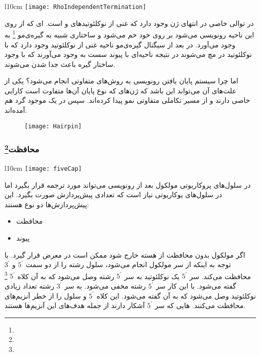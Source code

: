 \vspace{2.7cm}
\begin{wrapfigure}[13]{l}{10cm}
\centering
\texttt{[image: RhoIndependentTermination]}
\end{wrapfigure}

در
توالی خاصی در انتهای ژن وجود دارد که  غنی از نوکلئوتید‌های
و
است.
ای که از روی این ناحیه رونویسی می‌شود بر روی خود خم می‌شود و ساختاری شبیه به گیره‌ی‌مو
\footnote{}
به وجود می‌آورد.
در
بعد از سیگنال گیره‌ی‌مو ناحیه غنی از نوکلئوتید
وجود دارد که با نوکلئوتید
در
مچ می‌شوند در نتیجه ناحیه‌ای با پیوند سست به وجود می‌آورند که با وجود ساختار گیره‌ باعث جدا شدن
می‌شوند.

اما چرا سیستم پایان یافتن رونویسی به روش‌های متفاوتی انجام می‌شود؟ یکی از علت‌های آن می‌تواند این باشد که ژن‌های که نوع پایان آن‌ها متفاوت است کارایی خاصی دارند و از مسیر تکاملی متفاوتی نمو پیدا کرده‌اند. سپس در یک موجود گرد هم آمده‌اند.

\begin{figure}[htbp]
\centering
\texttt{[image: Hairpin]}
\end{figure}

\pagebreak
\subsubsection{محافظت\protect\footnote{}}

\begin{wrapfigure}[20]{l}{10cm}
\centering
\texttt{[image: fiveCap]}
\end{wrapfigure}

در سلول‌های پروکاریوتی
مولکول
بعد از رونویسی می‌تواند مورد ترجمه قرار بگیرد اما در سلول‌های یوکاریوتی نیاز است که تعدادی پیش‌پردازش صورت بگیرد. این پیش‌پردازش‌ها دو نوع هستند:
\begin{itemize}
\item محافظت
\item پیوند
\end{itemize} 

اگر مولکول
بدون محافظت از هسته خارج شود ممکن است در معرض
قرار گیرد.
با توجه به اینکه
از سر مولکول انجام می‌شود، سلول رشته
را از دو سمت
$ 5^\prime $
و
$ 3^\prime $
محافظت می‌کند. سر
$ 5^\prime $
یک نوکلئوتید
به سر
$ 5^\prime $
رشته
وصل می‌شود که به آن کلاه
$ 5^\prime $
\footnote{}
گفته می‌شود. با این کار سر
$ 5^\prime $
رشته
مخفی می‌شود.
به سر
$ 3^\prime $
رشته
تعداد زیادی نوکلئوتید
وصل می‌شود که به آن
گفته می‌شود.
این کلاه
$ 5^\prime $
و
سلول را از خطر آنزیم‌های
محافظت می‌کنند.
هایی که سر
$ 5^\prime $
آشکار دارند از جمله هدف‌های این آنزیم‌ها هستند.

